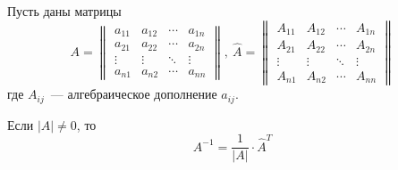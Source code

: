 \begin{theorem}
Пусть даны матрицы
\begin{equation*}
A =
\begin{Vmatrix}
a_{11} & a_{12} & \cdots & a_{1n} \\
a_{21} & a_{22} & \cdots & a_{2n} \\
\vdots & \vdots & \ddots & \vdots \\
a_{n1} & a_{n2} & \cdots & a_{nn}
\end{Vmatrix}, \ 
\hat A =
\begin{Vmatrix}
A_{11} & A_{12} & \cdots & A_{1n} \\
A_{21} & A_{22} & \cdots & A_{2n} \\
\vdots & \vdots & \ddots & \vdots \\
A_{n1} & A_{n2} & \cdots & A_{nn}
\end{Vmatrix}
\end{equation*}
где $A_{ij}$~--- алгебраическое дополнение $a_{ij}$.

Если $|A| \neq 0$, то
\begin{equation*}
A^{-1} = \frac1{|A|} \cdot \hat A^T
\end{equation*}
\end{theorem}
